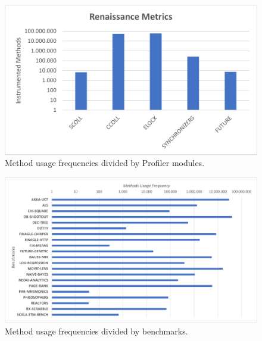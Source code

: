 \documentclass[]{usiinfthesis}
\begin{document}
\begin{figure}
    \centering
    \includegraphics[scale=0.7]{Immagini/final metrics.png} 
    \caption{Method usage frequencies divided by Profiler modules.}
    \label{fig:fig1}
\end{figure}

\begin{figure}
    \centering
    \includegraphics[scale=0.7]{Immagini/finalmetricsbenchm.png} 
    \caption{Method usage frequencies divided by benchmarks.}
    \label{fig:fig1}
\end{figure}
\end{document}
